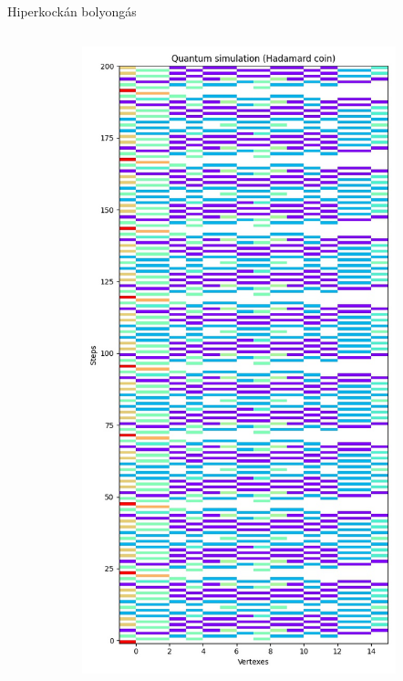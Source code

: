 \documentclass[aspectratio=169]{beamer}
\begin{document}
\begin{frame}{Hiperkockán bolyongás}
\begin{columns}[onlytextwidth]
\begin{column}{.23\textwidth}
    \end{column}
    \begin{column}{.08\textwidth}
    \end{column}
    \begin{column}{.23\textwidth}
      \begin{figure}
        \includegraphics[width=0.9\textwidth]{./tdk_figures/results/hypercube/hadamard.jpg}
      \end{figure}
    \end{column}

\end{columns}
\end{frame}
\end{document}
